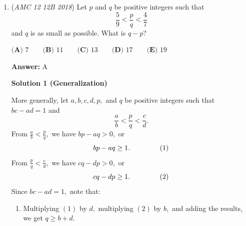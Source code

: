 \begin{enumerate}
\textbf{Solution 5 (Trigonometry)}

It is easy to see that the figure the solutions form is that of an regular octagon $ABCDEFGH$ With center $O$ such that $AO = \sqrt{3}.$ Also, the minimum area of a triangle formed by the solutions would be that of Triangle $ABC$, since the three points are consecutive vertices of the octagon. By dropping an altitude from $O$ to $AB$, note that $\frac{1}{2} AB = \sqrt{3} \sin(22.5).$ Thus, $AB = 2\sqrt{3} \sin(22.5).$ Now given the length of $AB$ we need to find the area of $ABC,$ which, by simple trigonometry, is given as 
 \[AB \cos(22.5) \cdot AB \sin(22.5) = 12 \sin^3(22.5) \cdot \cos(22.5).\] By the half angle formulas, $\sin(22.5) = \sqrt{\frac{1 - \sin(45)}{2}} = \frac{\sqrt{2-\sqrt{2}}}{2},$ and $\cos(22.5)$ is its conjugate $\frac{\sqrt{2+\sqrt{2}}}{2}.$ Doing some expanding and simplifying, 
 \[12 \cdot \left ( \frac{\sqrt{2-\sqrt{2}}}{2} \right)^3 \cdot \left (\frac{\sqrt{2+\sqrt{2}}}{2} \right) = \frac{3\sqrt{12-8\sqrt{2}}}{4}.\] Further simplifying, we obtain that the desired expression is $\frac{3 \sqrt{3 - 2\sqrt{2}}}{2}.$ Note that $(\sqrt{2} - 1)^2 = 3 - 2\sqrt{2},$ so our answer comes out to be $\frac{3(\sqrt{2}-1)}{2} = \boxed{\textbf{(B) } \frac{3}{2}\sqrt{2}-\frac{3}{2}}.$



	\item (\textit{AMC 12 12B 2018}) Let $p$ and $q$ be positive integers such that 
 \[\frac{5}{9} < \frac{p}{q} < \frac{4}{7}\]and $q$ is as small as possible. What is $q-p$?


 $\textbf{(A) } 7 \qquad \textbf{(B) } 11 \qquad \textbf{(C) } 13 \qquad \textbf{(D) } 17 \qquad \textbf{(E) } 19$

 \textbf{Answer: }A



\textbf{Solution 1 (Generalization)}

More generally, let $a,b,c,d,p,$ and $q$ be positive integers such that $bc-ad=1$ and 
 \[\frac ab < \frac pq < \frac cd.\]From $\frac ab < \frac pq,$ we have $bp-aq>0,$ or 
 \[bp-aq\geq1. \hspace{15mm} (1)\]From $\frac pq < \frac cd,$ we have $cq-dp>0,$ or 
 \[cq-dp\geq1. \hspace{15mm} (2)\]Since $bc-ad=1,$ note that:

 
            \begin{enumerate} 
        \item Multiplying $(1)$ by $d,$ multiplying $(2)$ by $b,$ and adding the results, we get $q\geq b+d.$


\end{enumerate}
\end{enumerate}
